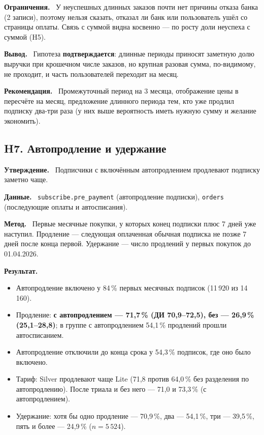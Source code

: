 \documentclass[11pt,a4paper]{article}
\newcommand{\hblock}[1]{\par\smallskip\noindent\textbf{#1.}~}
\begin{document}
\hblock{Ограничения} У неуспешных длинных заказов почти нет причины отказа банка (2 записи), поэтому нельзя сказать, отказал ли банк или пользователь ушёл со страницы оплаты. Связь с суммой видна косвенно --- по росту доли неуспеха с суммой (H5).

\hblock{Вывод} Гипотеза \textbf{подтверждается}: длинные периоды приносят заметную долю выручки при крошечном числе заказов, но крупная разовая сумма, по-видимому, не проходит, и часть пользователей переходит на месяц.

\hblock{Рекомендация} Промежуточный период на 3 месяца, отображение цены в пересчёте на месяц, предложение длинного периода тем, кто уже продлил подписку два-три раза (у них выше вероятность иметь нужную сумму и желание экономить).

\subsection{H7. Автопродление и удержание}

\hblock{Утверждение} Подписчики с включённым автопродлением продлевают подписку заметно чаще.

\hblock{Данные} \texttt{subscribe.pre\_payment} (автопродление подписки), \texttt{orders} (последующие оплаты и автосписания).

\hblock{Метод} Первые месячные покупки, у которых конец подписки плюс 7 дней уже наступил. Продление --- следующая оплаченная обычная подписка не позже 7 дней после конца первой. Удержание --- число продлений у первых покупок до 01.04.2026.

\hblock{Результат}
\begin{itemize}
  \item Автопродление включено у 84\,\% первых месячных подписок (11\,920 из 14\,160).
  \item Продление: \textbf{с автопродлением --- 71,7\,\% (ДИ 70,9--72,5), без --- 26,9\,\% (25,1--28,8)}; в группе с автопродлением 54,1\,\% продлений прошли автосписанием.
  \item Автопродление отключили до конца срока у 54,3\,\% подписок, где оно было включено.
  \item Тариф: Silver продлевают чаще Lite (71,8 против 64,0\,\% без разделения по автопродлению). После триала и без него --- 71,0 и 73,3\,\% (с автопродлением).
  \item Удержание: хотя бы одно продление --- 70,9\,\%, два --- 54,1\,\%, три --- 39,5\,\%, пять и более --- 24,9\,\% ($n=5\,524$).
\end{itemize}
\end{document}
